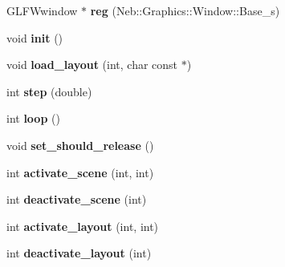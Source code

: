 \begin{DoxyCompactItemize}
\item 
\hypertarget{classNeb_1_1App_1_1Base_a45b4feac51086c0b894eb2e30ea98e03}{\-G\-L\-F\-Wwindow $\ast$ {\bfseries reg} (\-Neb\-::\-Graphics\-::\-Window\-::\-Base\-\_\-s)}\label{classNeb_1_1App_1_1Base_a45b4feac51086c0b894eb2e30ea98e03}

\item 
\hypertarget{classNeb_1_1App_1_1Base_a7872dfc7dbb8cd5a2d53326db38076cb}{void {\bfseries init} ()}\label{classNeb_1_1App_1_1Base_a7872dfc7dbb8cd5a2d53326db38076cb}

\item 
\hypertarget{classNeb_1_1App_1_1Base_a54df5d224b6b7fe039ffb5805be8460b}{void {\bfseries load\-\_\-layout} (int, char const $\ast$)}\label{classNeb_1_1App_1_1Base_a54df5d224b6b7fe039ffb5805be8460b}

\item 
\hypertarget{classNeb_1_1App_1_1Base_af1be18f5e33e09cd193ea159b75bff70}{int {\bfseries step} (double)}\label{classNeb_1_1App_1_1Base_af1be18f5e33e09cd193ea159b75bff70}

\item 
\hypertarget{classNeb_1_1App_1_1Base_a126da4ec133d3e67e06bc16c962a5aac}{int {\bfseries loop} ()}\label{classNeb_1_1App_1_1Base_a126da4ec133d3e67e06bc16c962a5aac}

\item 
\hypertarget{classNeb_1_1App_1_1Base_a3a0d4a61b10740915bd60fb24c607fea}{void {\bfseries set\-\_\-should\-\_\-release} ()}\label{classNeb_1_1App_1_1Base_a3a0d4a61b10740915bd60fb24c607fea}

\item 
\hypertarget{classNeb_1_1App_1_1Base_a495ad0c7fade8667358ae93bf8d193ef}{int {\bfseries activate\-\_\-scene} (int, int)}\label{classNeb_1_1App_1_1Base_a495ad0c7fade8667358ae93bf8d193ef}

\item 
\hypertarget{classNeb_1_1App_1_1Base_ac695c0ce0790177af0a8e8560a8368be}{int {\bfseries deactivate\-\_\-scene} (int)}\label{classNeb_1_1App_1_1Base_ac695c0ce0790177af0a8e8560a8368be}

\item 
\hypertarget{classNeb_1_1App_1_1Base_a2c15bc36fb6d54115396c83d07c1ed4e}{int {\bfseries activate\-\_\-layout} (int, int)}\label{classNeb_1_1App_1_1Base_a2c15bc36fb6d54115396c83d07c1ed4e}

\item 
\hypertarget{classNeb_1_1App_1_1Base_a8569d504264c9473c32cec6f21399839}{int {\bfseries deactivate\-\_\-layout} (int)}\label{classNeb_1_1App_1_1Base_a8569d504264c9473c32cec6f21399839}

\end{DoxyCompactItemize}
